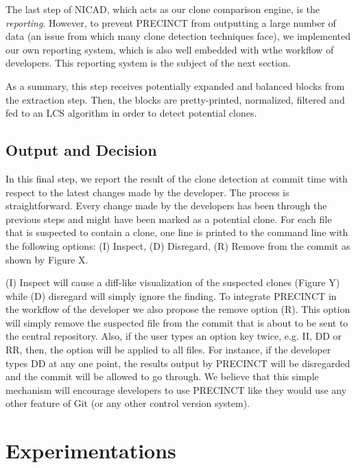 \documentclass[conference]{IEEEtran}
\begin{document}
The last step of NICAD, which acts as our clone comparison engine, is the \textit{reporting}. However, to prevent PRECINCT from outputting  a large number of data (an issue from which many clone detection techniques face), we  implemented our own reporting system, which is also well embedded with wthe workflow of developers. This reporting system is the subject of the next section.

As a summary, this step receives potentially expanded and balanced blocks from the extraction step.
Then, the blocks are pretty-printed, normalized, filtered and fed to an LCS algorithm in order to detect potential clones.

\subsection{Output and Decision}
\label{sub:Output and Decision}

In this final step, we report the result of the clone detection at commit time with respect to the latest changes made by the developer. The process is straightforward. Every change made by the developers has been through the previous steps and might have been marked as a potential clone. For each file that is suspected to contain a clone, one line is printed to the command line with the following options: (I) Inspect, (D) Disregard, (R) Remove from the commit as shown by Figure X.

(I) Inspect will cause a diff-like visualization of the suspected clones (Figure Y) while (D) disregard will simply ignore the finding.
To integrate PRECINCT in the workflow of the developer we also propose the  remove option (R). This option will simply remove the suspected file from the commit that is about to be sent to the central repository.
Also, if the user types an option key twice, e.g. II, DD or RR, then, the option will be applied to all files.
For instance, if the developer types DD at any one point, the results output by PRECINCT will be disregarded and the commit will be allowed to go through. We believe that this simple mechanism will encourage developers to use PRECINCT like they would use any other feature of Git (or any other control version system).



\section{Experimentations}
\label{sec:Experimentations}
\end{document}
